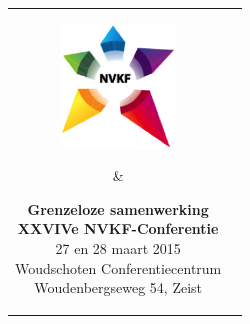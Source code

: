 \documentclass[a4paper,10pt]{report}
\begin{document}
\pagestyle{empty}
\thispagestyle{empty}

\begin{multicols*}{3}

\noindent
\begin{tabular}{cc}
    \parbox[b]{0.4\linewidth}{%
\includegraphics[width=3cm]{nvkf_logo}
}
& 
\parbox[b]{0.6\linewidth}{%
\begin{center}
{\bfseries Grenzeloze samenwerking}\\ \vspace{0.15cm} 
{\bfseries XXVIVe NVKF-Conferentie}\\ \vspace{0.15cm}
{27 en 28 maart 2015}\\ \vspace{0.15cm}
{Woudschoten Conferentiecentrum}\\
{Woudenbergseweg 54, Zeist}

\end{center}
}
\end{tabular}


\newcommand{\plenairheader}[2]{%
\begin{center}
{\color{DarkBlue}{\textbf{#1}}}\\
{\textbf{#2}}
\end{center}
}

\newcommand{\parallelheader}[2]{%
\parskip=0pt
\noindent{{\color{Blue}{\textbf{\textit{{#1}}}}}\hfill{\textit{{#2}}}}\vspace{-0.2cm}
}

\newcommand{\parallelitem}[1]{%
\noindent \hfill{\color{DarkBlue}{\textbf{\textsc{{#1}}}}}\hfill\strut
}

\newenvironment{packed_enum}{%
    \begin{enumerate}
    \setlength{\itemsep}{1pt}
    \setlength{\itemindent}{0pt}
    \setlength{\parskip}{0pt}
    \setlength{\parsep}{0pt}
    \setlength{\leftmargin}{0pt}
}{\end{enumerate}}


\end{multicols*}
\end{document}
